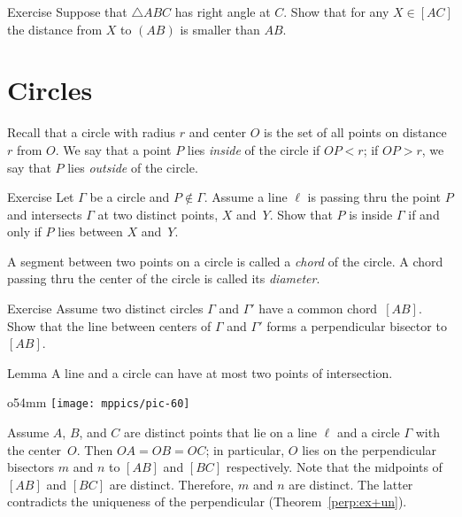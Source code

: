 \begin{thm}{Exercise}\label{ex:right-triangle-inq}
Suppose that $\triangle ABC$ has right angle at $C$.
Show that for any $X\in [AC]$ the distance from $X$ to $(AB)$ is smaller than $AB$.
\end{thm}




\section*{Circles}

Recall that a circle with radius $r$ and center $O$ is the set of all points on distance $r$ from $O$.
We say that a point $P$ lies \emph{inside} of the circle if $OP<r$; 
if $OP>r$, we say that $P$ lies \emph{outside} of the circle.
\label{def:circle}

\begin{thm}{Exercise}\label{ex:inside-outside}
Let $\Gamma$ be a circle and $P\notin \Gamma$.
Assume a line $\ell$ is passing thru the point $P$
and intersects $\Gamma$ at two distinct points, $X$ and~$Y$.
Show that $P$ is inside $\Gamma$ if and only if $P$ lies between $X$ and~$Y$.
\end{thm}


A segment between two points on a circle is called a \emph{chord} of the circle.
A chord passing thru the center of the circle is called its \emph{diameter}.

\begin{thm}{Exercise}\label{ex:chord-perp}
Assume two distinct circles $\Gamma$ and $\Gamma'$ have a common chord~$[A B]$.
Show that the line between centers of $\Gamma$ and $\Gamma'$ forms a perpendicular bisector to~$[A B]$.
\end{thm}



\begin{thm}[\abs]{Lemma}\label{lem:line-circle}
A line and a circle can have at most two points of intersection.
\end{thm}

\begin{wrapfigure}{o}{54mm}
\vskip-4mm
\centering
\texttt{[image: mppics/pic-60]}
\end{wrapfigure}

 Assume $A$, $B$, and $C$ are distinct points that lie on a line $\ell$ and a circle $\Gamma$ with the center~$O$.
Then $OA=OB=OC$; in particular, $O$ lies on the perpendicular bisectors 
$m$ and $n$ to $[A B]$ and $[B C]$ respectively.
Note that the midpoints of $[AB]$ and $[BC]$ are distinct.
Therefore, $m$ and $n$ are distinct.
The latter contradicts the uniqueness of the perpendicular (Theorem~\ref{perp:ex+un}).
\qeds

